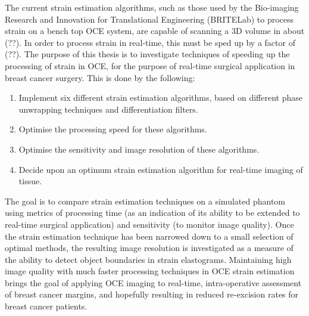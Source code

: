 The current strain estimation algorithms, such as those used by the Bio-imaging Research and Innovation for Translational Engineering (BRITELab) to process strain on a bench top OCE system, are capable of scanning a 3D volume in about (??). In order to process strain in real-time, this must be sped up by a factor of (??). The purpose of this thesis is to investigate techniques of speeding up the processing of strain in OCE, for the purpose of real-time surgical application in breast cancer surgery. This is done by the following:
\begin{enumerate}
	\item Implement six different strain estimation algorithms, based on different phase unwrapping techniques and differentiation filters.
	\item Optimise the processing speed for these algorithms.
	\item Optimise the sensitivity and image resolution of these algorithms.
	\item Decide upon an optimum strain estimation algorithm for real-time imaging of tissue.
\end{enumerate}
The goal is to compare strain estimation techniques on a simulated phantom using metrics of processing time (as an indication of its ability to be extended to real-time surgical application) and sensitivity (to monitor image quality). Once the strain estimation technique has been narrowed down to a small selection of optimal methods, the resulting image resolution is investigated as a measure of the ability to detect object boundaries in strain elastograms. Maintaining high image quality with much faster processing techniques in OCE strain estimation brings the goal of applying OCE imaging to real-time, intra-operative assessment of breast cancer margins, and hopefully resulting in reduced re-excision rates for breast cancer patients. 


